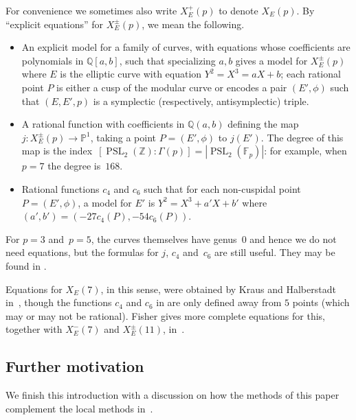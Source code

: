 \documentclass[12pt, reqno]{amsart}
\newcommand{\F}{\mathbb{F}}
\newcommand{\PP}{\mathbb{P}}
\newcommand{\Q}{\mathbb{Q}}
\newcommand{\Z}{\mathbb{Z}}
\newcommand{\PSL}{\operatorname{PSL}}
\numberwithin{equation}{section}
\theoremstyle{definition}
\theoremstyle{remark}
\begin{document}
For convenience 
we sometimes also write $X_E^+(p)$ to denote $X_E(p)$. 
By ``explicit equations'' for $X_E^{\pm}(p)$, we mean the
following.
\begin{itemize}
  \item An explicit model for a family of curves, with equations whose
    coefficients are polynomials in $\Q[a,b]$, such that specializing
    $a,b$ gives a model for $X_E^{\pm}(p)$ where $E$ is the elliptic
    curve with equation $Y^2=X^3=aX+b$; each rational point $P$ is
    either a cusp of the modular curve or encodes a pair $(E',\phi)$
    such that $(E,E', p)$ is a symplectic (respectively,
    antisymplectic) triple.
    \item A rational function with coefficients in $\Q(a,b)$ defining
      the map $j: X_E^{\pm}(p) \to \PP^1$, taking a point
      $P=(E',\phi)$ to $j(E')$.  The degree of this map is the
      index~$[\PSL_2(\Z):\Gamma(p)] = |\PSL_2(\F_p)|$: for example, when
        $p=7$ the degree is~$168$.
      \item Rational functions $c_4$ and $c_6$ such that for each
        non-cuspidal point~$P=(E',\phi)$, a model for $E'$ is
        $Y^2=X^3+a'X+b'$ where $(a',b')=(-27c_4(P),-54c_6(P))$.
\end{itemize}
For $p=3$ and~$p=5$, the curves themselves have genus~$0$ and hence we
do not need equations, but the formulas for $j$, $c_4$ and~$c_6$ are
still useful.  They may be found in \cite{Rubin-Silverberg}.

Equations for $X_E(7)$, in this sense, were obtained by Kraus and
Halberstadt in~\cite{Halberstadt-Kraus-XE7}, though the functions
$c_4$ and $c_6$ in \cite{Halberstadt-Kraus-XE7} are only defined away
from $5$ points (which may or may not be rational). Fisher gives more
complete equations for this, together with $X_E^-(7)$ and
$X_E^{\pm}(11)$, in~\cite{Fisher}.



\subsection{Further motivation} \label{S:motivation}
We finish this introduction with a discussion on how the methods of
this paper complement the local methods in~\cite{FKSym}.
\end{document}
